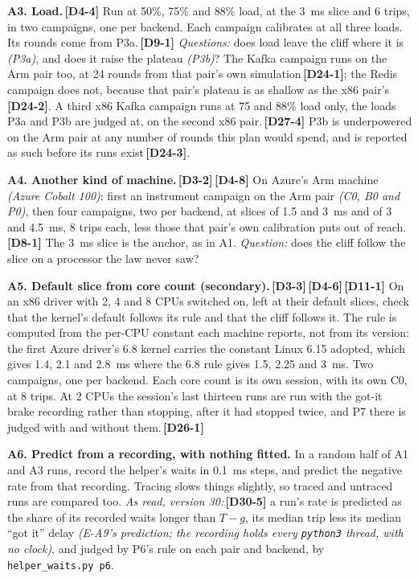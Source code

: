 \documentclass[11pt]{article}
\newcommand{\gl}[1]{{\color{soft}\itshape\small (#1)}}
\newcommand{\chg}[1]{\,{\color{chgcol}\bfseries\footnotesize[#1]}}
\newcommand{\chgold}[1]{\,{\color{oldcol}\bfseries\footnotesize[#1]}}
\begin{document}
\textbf{A3. Load.}\chgold{D4-4} Run at 50\%, 75\% and 88\% load, at the 3~ms slice and 6 trips, in two campaigns, one per backend. Each campaign calibrates at all three loads. Its rounds come from P3a.\chgold{D9-1} \emph{Questions:} does load leave the cliff where it is \gl{P3a}, and does it raise the plateau \gl{P3b}? The Kafka campaign runs on the Arm pair too, at 24 rounds from that pair's own simulation\chgold{D24-1}; the Redis campaign does not, because that pair's plateau is as shallow as the x86 pair's\chgold{D24-2}. A third x86 Kafka campaign runs at 75 and 88\% load only, the loads P3a and P3b are judged at, on the second x86 pair.\chgold{D27-4} P3b is underpowered on the Arm pair at any number of rounds this plan would spend, and is reported as such before its runs exist\chgold{D24-3}.

\textbf{A4. Another kind of machine.}\chgold{D3-2}\chgold{D4-8} On Azure's Arm machine \gl{Azure Cobalt 100}: first an instrument campaign on the Arm pair \gl{C0, B0 and P0}, then four campaigns, two per backend, at slices of 1.5 and 3~ms and of 3 and 4.5~ms, 8 trips each, less those that pair's own calibration puts out of reach.\chgold{D8-1} The 3~ms slice is the anchor, as in A1. \emph{Question:} does the cliff follow the slice on a processor the law never saw?

\textbf{A5. Default slice from core count (secondary).}\chgold{D3-3}\chgold{D4-6}\chgold{D11-1} On an x86 driver with 2, 4 and 8 CPUs switched on, left at their default slices, check that the kernel's default follows its rule and that the cliff follows it. The rule is computed from the per-CPU constant each machine reports, not from its version: the first Azure driver's 6.8 kernel carries the constant Linux 6.15 adopted, which gives 1.4, 2.1 and 2.8~ms where the 6.8 rule gives 1.5, 2.25 and 3~ms. Two campaigns, one per backend. Each core count is its own session, with its own C0, at 8 trips. At 2 CPUs the session's last thirteen runs are run with the got-it brake recording rather than stopping, after it had stopped twice, and P7 there is judged with and without them.\chgold{D26-1}

\textbf{A6. Predict from a recording, with nothing fitted.} In a random half of A1 and A3 runs, record the helper's waits in 0.1~ms steps, and predict the negative rate from that recording. Tracing slows things slightly, so traced and untraced runs are compared too. \emph{As read, version 30:}\chg{D30-5} a run's rate is predicted as the share of its recorded waits longer than $T - g$, its median trip less its median ``got it'' delay \gl{E-A9's prediction; the recording holds every \texttt{python3} thread, with no clock}, and judged by P6's rule on each pair and backend, by \texttt{helper\_waits.py p6}.
\end{document}
